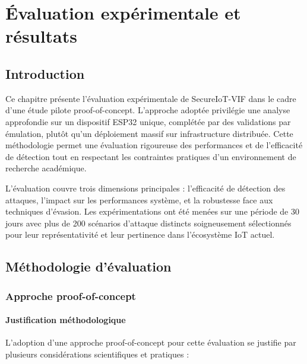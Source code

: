 
\chapter{Évaluation expérimentale et résultats}
\label{chap:evaluation}

\section{Introduction}

Ce chapitre présente l'évaluation expérimentale de SecureIoT-VIF dans le cadre d'une étude pilote proof-of-concept. L'approche adoptée privilégie une analyse approfondie sur un dispositif ESP32 unique, complétée par des validations par émulation, plutôt qu'un déploiement massif sur infrastructure distribuée. Cette méthodologie permet une évaluation rigoureuse des performances et de l'efficacité de détection tout en respectant les contraintes pratiques d'un environnement de recherche académique.

L'évaluation couvre trois dimensions principales : l'efficacité de détection des attaques, l'impact sur les performances système, et la robustesse face aux techniques d'évasion. Les expérimentations ont été menées sur une période de 30 jours avec plus de 200 scénarios d'attaque distincts soigneusement sélectionnés pour leur représentativité et leur pertinence dans l'écosystème IoT actuel.

\section{Méthodologie d'évaluation}

\subsection{Approche proof-of-concept}

\subsubsection{Justification méthodologique}

L'adoption d'une approche proof-of-concept pour cette évaluation se justifie par plusieurs considérations scientifiques et pratiques :

